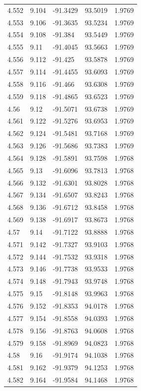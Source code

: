 \begin{tabular}{lllll}
4.552 & 9.104 & -91.3429 & 93.5019 & 1.9769 \\
4.553 & 9.106 & -91.3635 & 93.5234 & 1.9769 \\
4.554 & 9.108 & -91.384 & 93.5449 & 1.9769 \\
4.555 & 9.11 & -91.4045 & 93.5663 & 1.9769 \\
4.556 & 9.112 & -91.425 & 93.5878 & 1.9769 \\
4.557 & 9.114 & -91.4455 & 93.6093 & 1.9769 \\
4.558 & 9.116 & -91.466 & 93.6308 & 1.9769 \\
4.559 & 9.118 & -91.4865 & 93.6523 & 1.9769 \\
4.56 & 9.12 & -91.5071 & 93.6738 & 1.9769 \\
4.561 & 9.122 & -91.5276 & 93.6953 & 1.9769 \\
4.562 & 9.124 & -91.5481 & 93.7168 & 1.9769 \\
4.563 & 9.126 & -91.5686 & 93.7383 & 1.9769 \\
4.564 & 9.128 & -91.5891 & 93.7598 & 1.9768 \\
4.565 & 9.13 & -91.6096 & 93.7813 & 1.9768 \\
4.566 & 9.132 & -91.6301 & 93.8028 & 1.9768 \\
4.567 & 9.134 & -91.6507 & 93.8243 & 1.9768 \\
4.568 & 9.136 & -91.6712 & 93.8458 & 1.9768 \\
4.569 & 9.138 & -91.6917 & 93.8673 & 1.9768 \\
4.57 & 9.14 & -91.7122 & 93.8888 & 1.9768 \\
4.571 & 9.142 & -91.7327 & 93.9103 & 1.9768 \\
4.572 & 9.144 & -91.7532 & 93.9318 & 1.9768 \\
4.573 & 9.146 & -91.7738 & 93.9533 & 1.9768 \\
4.574 & 9.148 & -91.7943 & 93.9748 & 1.9768 \\
4.575 & 9.15 & -91.8148 & 93.9963 & 1.9768 \\
4.576 & 9.152 & -91.8353 & 94.0178 & 1.9768 \\
4.577 & 9.154 & -91.8558 & 94.0393 & 1.9768 \\
4.578 & 9.156 & -91.8763 & 94.0608 & 1.9768 \\
4.579 & 9.158 & -91.8969 & 94.0823 & 1.9768 \\
4.58 & 9.16 & -91.9174 & 94.1038 & 1.9768 \\
4.581 & 9.162 & -91.9379 & 94.1253 & 1.9768 \\
4.582 & 9.164 & -91.9584 & 94.1468 & 1.9768 \\

\end{tabular}
